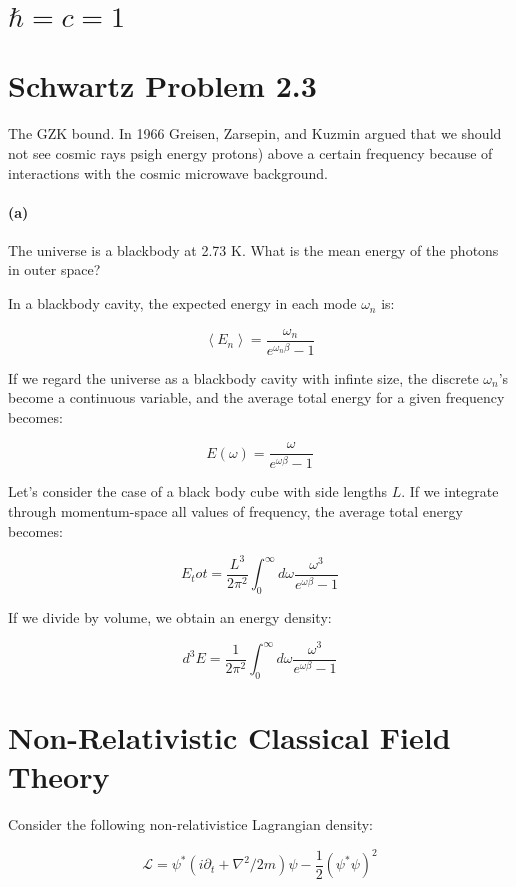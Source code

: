 \documentclass{article}
\newcommand{\Lagr}[0]{\mathcal{L}}
\begin{document}
\section{$\hbar = c = 1$}

\section{Schwartz Problem 2.3}

The GZK bound.
In 1966 Greisen, Zarsepin, and Kuzmin argued that we should not see cosmic
	rays psigh energy protons) above a certain frequency because
	of interactions with the cosmic microwave background.

\paragraph{(a)}
The universe is a blackbody at 2.73 K.
What is the mean energy of the photons in outer space?

In a blackbody cavity, the expected energy in each mode $\omega_n$ is:

\[ \left< E_n \right> = \frac{ \omega_n }{e^{\omega_n \beta} - 1} \]

If we regard the universe as a blackbody cavity with infinte size,
	the discrete $\omega_n$'s become a continuous variable,
	and the average total energy for a given frequency becomes:

\[ E(\omega) = \frac{ \omega }{ e^{\omega \beta} - 1} \] 

Let's consider the case of a black body cube with side lengths $L$.
If we integrate through momentum-space all values of frequency,
	the average total energy becomes:

\[ E_tot = \frac{L^3}{2 \pi^2} \int_0^\infty d\omega \frac{ \omega^3 }{e^{\omega \beta} - 1} \]

If we divide by volume, we obtain an energy density:

\[ d^3 E = \frac{1}{2 \pi^2} \int_0^\infty d\omega \frac{ \omega^3 }{e^{\omega \beta} - 1} \]

\section{Non-Relativistic Classical Field Theory}

Consider the following non-relativistice Lagrangian density:

\[ \Lagr = \psi^* \left( i \partial_t + \nabla^2/2m \right) \psi - \frac{1}{2} (\psi^* \psi)^2 \]
\end{document}
